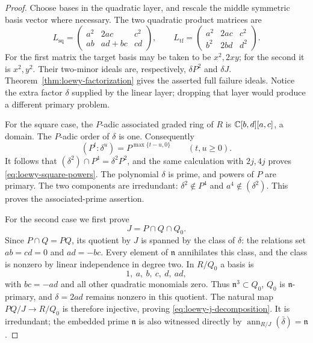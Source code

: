\begin{proof}
Choose bases in the quadratic layer, and rescale the middle symmetric
basis vector where necessary. The two quadratic product matrices are
\[
 L_{\mathrm{sq}}=
 \begin{pmatrix}a^2&2ac&c^2\\ab&ad+bc&cd\end{pmatrix},\qquad
 L_{\mathrm{tf}}=
 \begin{pmatrix}a^2&2ac&c^2\\b^2&2bd&d^2\end{pmatrix}.
\]
For the first matrix the target basis may be taken to be $x^2,2xy$;
for the second it is $x^2,y^2$. Their two-minor ideals are, respectively,
$\delta P^2$ and $\delta J$. Theorem~\ref{thm:loewy-factorization}
gives the asserted full failure ideals. Notice the extra factor
$\delta$ supplied by the linear layer; dropping that layer would
produce a different primary problem.

For the square case, the $P$-adic associated graded ring of $R$ is
$\mathbb C[b,d][a,c]$, a domain. The $P$-adic order of $\delta$ is one.
Consequently
\[
 (P^t:\delta^u)=P^{\max\{t-u,0\}}\qquad(t,u\ge0).
\]
It follows that $(\delta^2)\cap P^4=\delta^2P^2$, and the same
calculation with $2j,4j$ proves \eqref{eq:loewy-square-powers}.
The polynomial $\delta$ is prime, and powers of $P$ are primary.
The two components are irredundant: $\delta^2\notin P^4$ and
$a^4\notin(\delta^2)$. This proves the associated-prime assertion.

For the second case we first prove
\begin{equation}\label{eq:loewy-j-decomposition}
 J=P\cap Q\cap Q_0.
\end{equation}
Since $P\cap Q=PQ$, its quotient by $J$ is spanned by the class of
$\delta$: the relations set $ab=cd=0$ and $ad=-bc$. Every element
of $\mathfrak n$ annihilates this class, and the class is nonzero
by linear independence in degree two. In $R/Q_0$ a basis is
\[
 1,\ a,\ b,\ c,\ d,\ ad,
\]
with $bc=-ad$ and all other quadratic monomials zero. Thus
$\mathfrak n^3\subset Q_0$, $Q_0$ is $\mathfrak n$-primary, and
$\delta=2ad$ remains nonzero in this quotient. The natural map
$PQ/J\to R/Q_0$ is therefore injective, proving
\eqref{eq:loewy-j-decomposition}. It is irredundant; the embedded
prime $\mathfrak n$ is also witnessed directly by
$\operatorname{ann}_{R/J}(\bar\delta)=\mathfrak n$.


\end{proof}

